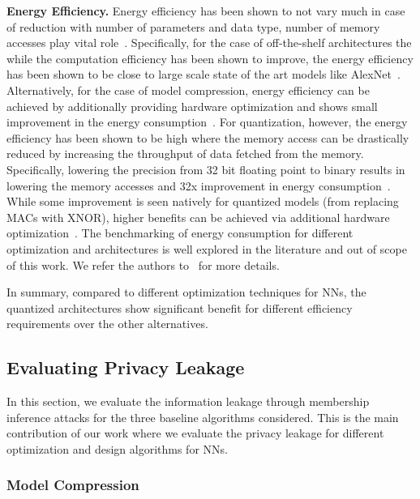 \noindent\textbf{Energy Efficiency.} Energy efficiency has been shown to not vary much in case of reduction with number of parameters and data type, number of memory accesses play vital role~\cite{6757323}.
Specifically, for the case of off-the-shelf architectures the while the computation efficiency has been shown to improve, the energy efficiency has been shown to be close to large scale state of the art models like AlexNet~\cite{DBLP:journals/corr/IandolaMAHDK16,8114708}.
Alternatively, for the case of model compression, energy efficiency can be achieved by additionally providing hardware optimization and shows small improvement in the energy consumption~\cite{journals/corr/YangCS16a,DBLP:journals/corr/HanMD15}.
For quantization, however, the energy efficiency has been shown to be high where the memory access can be drastically reduced by increasing the throughput of data fetched from the memory.
Specifically, lowering the precision from 32 bit floating point to binary results in lowering the memory accesses and 32x improvement in energy consumption~\cite{NIPS2016_6573,rastegari2016xnornet}.
While some improvement is seen natively for quantized models (from replacing MACs with XNOR), higher benefits can be achieved via additional hardware optimization~\cite{Umuroglu2017FINNAF}.
The benchmarking of energy consumption for different optimization and architectures is well explored in the literature and out of scope of this work. We refer the authors to~\cite{8114708} for more details.

In summary, compared to different optimization techniques for NNs, the quantized architectures show significant benefit for different efficiency requirements over the other alternatives.




\subsection{Evaluating Privacy Leakage}
\label{eval-leakage}

In this section, we evaluate the information leakage through membership inference attacks for the three baseline algorithms considered.
This is the main contribution of our work where we evaluate the privacy leakage for different optimization and design algorithms for NNs.

\subsubsection{Model Compression}

